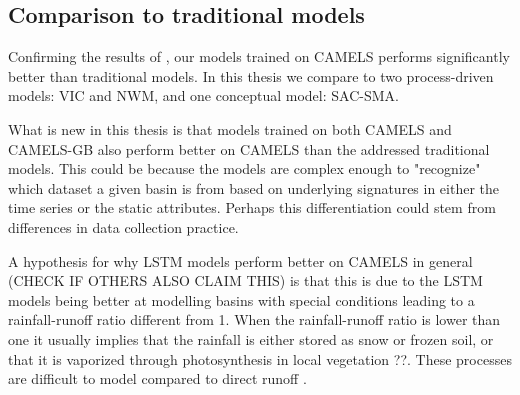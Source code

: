\subsection{Comparison to traditional models}
Confirming the results of \citet{lstm_second_paper,lstm_third_paper}, our models 
trained on CAMELS performs significantly better than traditional models. In this 
thesis we compare to two process-driven models: VIC and NWM, and one conceptual 
model: SAC-SMA. 

What is new in this thesis is that models trained on both CAMELS and CAMELS-GB 
also perform better on CAMELS than the addressed traditional models. This could 
be because the models are complex enough to "recognize" which dataset a given 
basin is from based on underlying signatures in either the time series or the 
static attributes. Perhaps this differentiation could stem from differences in 
data collection practice. 

A hypothesis for why LSTM models perform better on CAMELS in general
(CHECK IF OTHERS ALSO CLAIM THIS) \citationneeded is that this is due to the LSTM 
models being better at modelling basins with special conditions leading to 
a rainfall-runoff ratio different from 1. When the rainfall-runoff ratio is lower 
than one it usually implies that the rainfall is either stored as snow or frozen 
soil, or that it is vaporized through photosynthesis in local vegetation \citationneeded ??. 
These processes are difficult to model compared to direct runoff \citationneeded.
